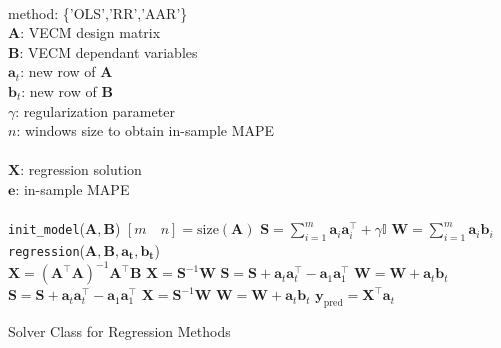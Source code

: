 \begin{algorithm}[ht]
\begin{algorithmic}[1]
\REQUIRE $\,$ \\
method: \{'OLS','RR','AAR'\} \\
$\mathbf{A}$: VECM design matrix \\
$\mathbf{B}$: VECM dependant variables \\
$\mathbf{a}_t$: new row of $\mathbf{A}$ \\
$\mathbf{b}_t$: new row of $\mathbf{B}$ \\
$\gamma$: regularization parameter \\
$n$: windows size to obtain in-sample MAPE \\
\ENSURE  $\,$ \\
$\mathbf{X}$: regression solution \\
$\mathbf{e}$: in-sample MAPE \\
\quad \\
\texttt{init\_model}($\mathbf{A},\mathbf{B}$)
\STATE $ [m \quad n] = \text{size}(\mathbf{A}) $ 
\STATE $\mathbf{S} = \displaystyle \sum_{i=1}^m \mathbf{a}_i \mathbf{a}_i^\top + \gamma \mathbb{I}$
\STATE $\mathbf{W} = \displaystyle \sum_{i=1}^m \mathbf{a}_i \mathbf{b}_i$
\quad \\
\texttt{regression}($\mathbf{A},\mathbf{B},\mathbf{a_t},\mathbf{b_t}$) \\
        \STATE $\mathbf{X}=(\mathbf{A}^\top \mathbf{A})^{-1}\mathbf{A}^\top
        \mathbf{B}$
        \STATE $\mathbf{X} = \mathbf{S}^{-1} \mathbf{W} $
        \STATE $\mathbf{S} = \mathbf{S}+
        \mathbf{a}_t \mathbf{a}_t^\top-
        \mathbf{a}_1 \mathbf{a}_1^\top$
        \STATE $\mathbf{W} = \mathbf{W} + \mathbf{a}_t \mathbf{b}_t$
        \STATE $\mathbf{S} = \mathbf{S}+
        \mathbf{a}_t \mathbf{a}_t^\top-
        \mathbf{a}_1 \mathbf{a}_1^\top$
        \STATE $\mathbf{X} = \mathbf{S}^{-1} \mathbf{W} $
        \STATE $\mathbf{W} = \mathbf{W} + \mathbf{a}_t \mathbf{b}_t$
\ENDIF
\STATE $\mathbf{y}_{\text{pred}} = \mathbf{X}^\top \mathbf{a}_t$
\end{algorithmic}
\caption{Solver Class for Regression Methods}
\label{alg:solver}
\end{algorithm}






